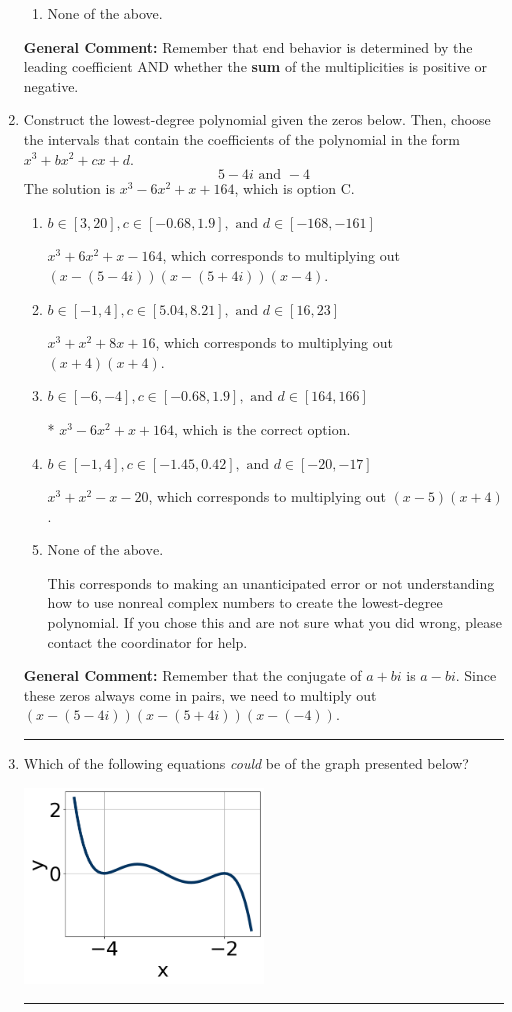 \documentclass{extbook}[14pt]
\newcommand{\litem}[1]{\item #1

\rule{\textwidth}{0.4pt}}
\begin{document}
\begin{enumerate}
{\begin{enumerate}[label=\Alph*.]
\begin{multicols}{2}
\end{multicols}\item None of the above.\end{enumerate}
\textbf{General Comment:} Remember that end behavior is determined by the leading coefficient AND whether the \textbf{sum} of the multiplicities is positive or negative.
}
\litem{
Construct the lowest-degree polynomial given the zeros below. Then, choose the intervals that contain the coefficients of the polynomial in the form $x^3+bx^2+cx+d$.
\[ 5 - 4 i \text{ and } -4 \]The solution is \( x^{3} -6 x^{2} +x + 164 \), which is option C.\begin{enumerate}[label=\Alph*.]
\item \( b \in [3, 20], c \in [-0.68, 1.9], \text{ and } d \in [-168, -161] \)

$x^{3} +6 x^{2} +x -164$, which corresponds to multiplying out $(x-(5 - 4 i))(x-(5 + 4 i))(x -4)$.
\item \( b \in [-1, 4], c \in [5.04, 8.21], \text{ and } d \in [16, 23] \)

$x^{3} + x^{2} +8 x + 16$, which corresponds to multiplying out $(x + 4)(x + 4)$.
\item \( b \in [-6, -4], c \in [-0.68, 1.9], \text{ and } d \in [164, 166] \)

* $x^{3} -6 x^{2} +x + 164$, which is the correct option.
\item \( b \in [-1, 4], c \in [-1.45, 0.42], \text{ and } d \in [-20, -17] \)

$x^{3} + x^{2} -x -20$, which corresponds to multiplying out $(x -5)(x + 4)$.
\item \( \text{None of the above.} \)

This corresponds to making an unanticipated error or not understanding how to use nonreal complex numbers to create the lowest-degree polynomial. If you chose this and are not sure what you did wrong, please contact the coordinator for help.
\end{enumerate}

\textbf{General Comment:} Remember that the conjugate of $a+bi$ is $a-bi$. Since these zeros always come in pairs, we need to multiply out $(x-(5 - 4 i))(x-(5 + 4 i))(x-(-4))$.
}
\litem{
Which of the following equations \textit{could} be of the graph presented below?

\begin{center}
    \includegraphics[width=0.5\textwidth]{../Figures/polyGraphToFunctionCopyA.png}
\end{center}


}
\end{enumerate}
\end{document}
